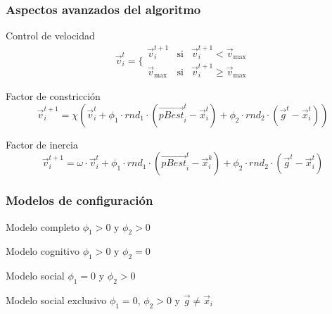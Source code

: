 \documentclass[10pt,compress]{beamer}
\begin{document}
 \begin{frame}
	\frametitle{Aspectos avanzados del algoritmo}
		\begin{block}{Control de velocidad}
			\[	   
				\vec{v}^t_i = \{
						\begin{matrix} 
								\vec{v}^{t+1}_i & \mbox{si}& \vec{v}^{t+1}_i < \vec{v}_{\max}\\
								\vec{v}_{\max} & \mbox{si}& \vec{v}^{t+1}_i \geq \vec{v}_{\max}
						\end{matrix}    
			\]	
		\end{block}
	\begin{block}{Factor de constricci\'on}
		\[  \vec{v}^{t+1}_{i} = \chi \left( \vec{v}^t_i + \phi_1 \cdot rnd_1 \cdot \left(\vec{pBest}^t_i - \vec{x}^t_i \right) 
					    + \phi_2 \cdot rnd_2 \cdot \left(\vec{g}^t - \vec{x}^t_i \right) \right) 
     \]
  \end{block}
		\begin{block}{Factor de inercia}
		\[  
		\vec{v}^{t+1}_{i} = \omega \cdot \vec{v}^t_i + \phi_1 \cdot rnd_1 \cdot \left(\vec{pBest}^t_i - \vec{x}^k_i \right) 
					    + \phi_2 \cdot rnd_2 \cdot \left(\vec{g}^t - \vec{x}^t_i \right) 
     \]
  \end{block}
\end{frame}

\begin{frame}
	\frametitle{Modelos de configuraci\'on}
	
	\begin{block}{Modelo completo}
     \textbf{$\phi_1 > 0 \text{ y } \phi_2 > 0$} 
	\end{block}
	\begin{block}{Modelo cognitivo}
     \textbf{$\phi_1 > 0 \text{ y } \phi_2 = 0$} 
	\end{block}
	\begin{block}{Modelo social}
     \textbf{$\phi_1 = 0 \text{ y } \phi_2 > 0$}
	\end{block}
	\begin{block}{Modelo social exclusivo}
     \textbf{$\phi_1 = 0 \text{, } \phi_2 > 0 \text{ y } \vec{g} \neq \vec{x}_i$}
  \end{block}
\end{frame}
\end{document}

